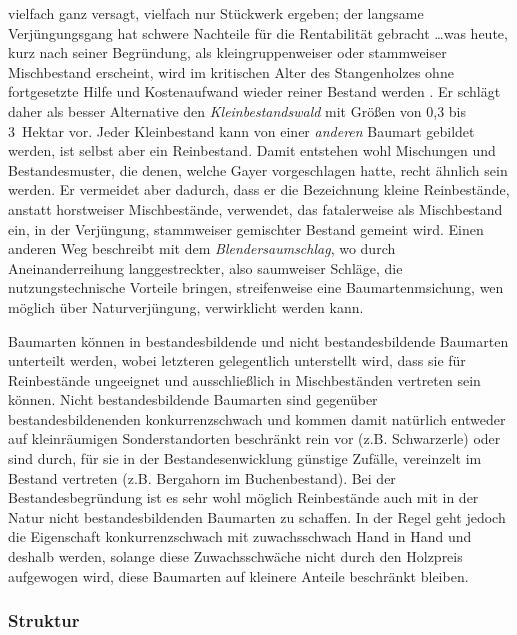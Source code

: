 \documentclass[twocolumn]{scrartcl}
\begin{document}
vielfach ganz versagt, vielfach nur Stückwerk ergeben; der langsame
Verjüngungsgang hat schwere Nachteile für die Rentabilität gebracht
\dots was heute, kurz nach seiner Begründung, als kleingruppenweiser
oder stammweiser Mischbestand erscheint, wird im kritischen Alter des
Stangenholzes ohne fortgesetzte Hilfe und Kostenaufwand wieder reiner
Bestand werden\flqq{}
\citep[S.~547]{mayr1909WaldbauAufNaturgesetzlicherGrundlage}. Er
schlägt daher als besser Alternative den \emph{Kleinbestandswald} mit
Größen von 0,3 bis 3~Hektar vor. Jeder Kleinbestand kann von einer
\emph{anderen} Baumart gebildet werden, ist selbst aber ein
Reinbestand. Damit entstehen wohl Mischungen und Bestandesmuster, die
denen, welche Gayer vorgeschlagen hatte, recht ähnlich sein werden. Er
vermeidet aber dadurch, dass er die Bezeichnung kleine Reinbestände,
anstatt horstweiser Mischbestände, verwendet, das fatalerweise als
Mischbestand ein, in der Verjüngung, stammweiser gemischter Bestand
gemeint wird. Einen anderen Weg beschreibt
\cite{wagner1923DerBlendersaumschlagUndSeinSystem} mit dem
\emph{Blendersaumschlag}, wo durch Aneinanderreihung langgestreckter,
also saumweiser Schläge, die nutzungstechnische Vorteile bringen,
streifenweise eine Baumartenmsichung, wen möglich über
Naturverjüngung, verwirklicht werden kann.

Baumarten können in bestandesbildende und nicht bestandesbildende
Baumarten unterteilt werden, wobei letzteren gelegentlich unterstellt
wird, dass sie für Reinbestände ungeeignet und ausschließlich in
Mischbeständen vertreten sein können. Nicht bestandesbildende
Baumarten sind gegenüber bestandesbildenenden konkurrenzschwach und
kommen damit natürlich entweder auf kleinräumigen Sonderstandorten
beschränkt rein vor (z.B. Schwarzerle) oder sind durch, für sie in der
Bestandesenwicklung günstige Zufälle, vereinzelt im Bestand vertreten
(z.B. Bergahorn im Buchenbestand). Bei der Bestandesbegründung ist es
sehr wohl möglich Reinbestände auch mit in der Natur nicht bestandesbildenden
Baumarten zu schaffen. In der Regel geht jedoch die Eigenschaft
konkurrenzschwach mit zuwachsschwach Hand in Hand und deshalb werden,
solange diese Zuwachsschwäche nicht durch den Holzpreis aufgewogen
wird, diese Baumarten auf kleinere Anteile beschränkt bleiben.

\subsubsection{Struktur}
\label{sssec:struktur}
\end{document}
